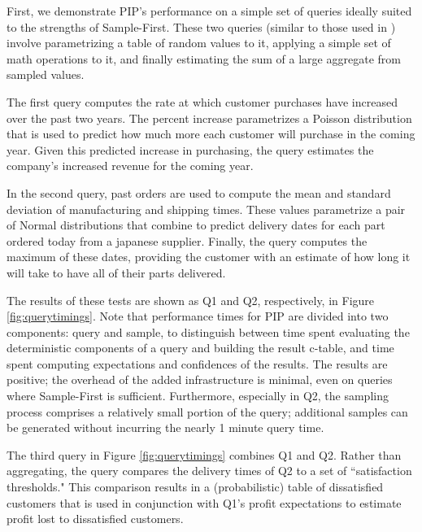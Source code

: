 First, we demonstrate PIP's performance on a simple set of queries ideally suited to the strengths of Sample-First.  These two queries (similar to those used in \cite{MCDB}) involve parametrizing a table of random values to it, applying a simple set of math operations to it, and finally estimating the sum of a large aggregate from sampled values.  

The first query computes the rate at which customer purchases have increased over the past two years.  The percent increase parametrizes a Poisson distribution that is used to predict how much more each customer will purchase in the coming year.  Given this predicted increase in purchasing, the query estimates the company's increased revenue for the coming year.

In the second query, past orders are used to compute the mean and standard deviation of manufacturing and shipping times.  These values parametrize a pair of Normal distributions that combine to predict delivery dates for each part ordered today from a japanese supplier.  Finally, the query computes the maximum of these dates, providing the customer with an estimate of how long it will take to have all of their parts delivered.

The results of these tests are shown as Q1 and Q2, respectively, in Figure \ref{fig:querytimings}.  Note that performance times for PIP are divided into two components: query and sample, to distinguish between time spent evaluating the deterministic components of a query and building the result c-table, and time spent computing expectations and confidences of the results.  The results are positive; the overhead of the added infrastructure is minimal, even on queries where Sample-First is sufficient.  Furthermore, especially in Q2, the sampling process comprises a relatively small portion of the query; additional samples can be generated without incurring the nearly 1 minute query time.

The third query in Figure \ref{fig:querytimings} combines Q1 and Q2.  Rather than aggregating, the query compares the delivery times of Q2 to a set of ``satisfaction thresholds."  This comparison results in a (probabilistic) table of dissatisfied customers that is used in conjunction with Q1's profit expectations to estimate profit lost to dissatisfied customers.  

